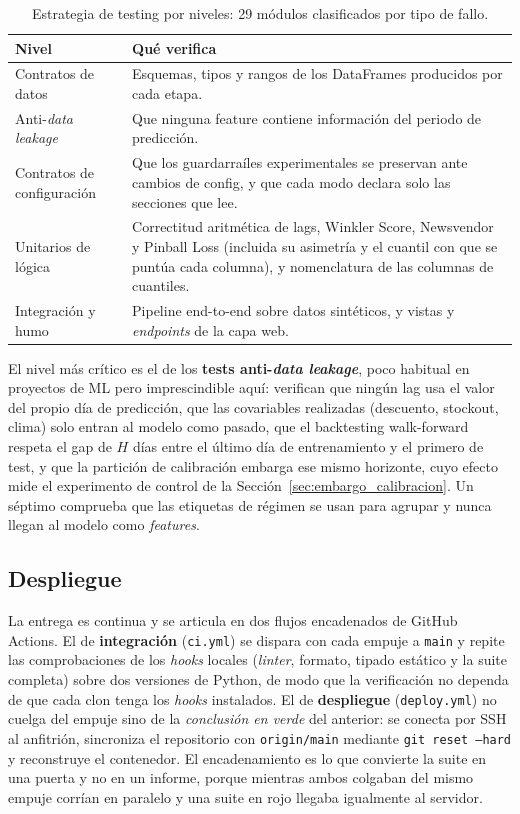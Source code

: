 \begin{table}[htbp]
    \centering
    \small
    \begin{tabular}{lp{9.5cm}}
        \toprule
        \textbf{Nivel} & \textbf{Qué verifica} \\
        \midrule
        Contratos de datos & Esquemas, tipos y rangos de los DataFrames producidos por cada etapa. \\
        Anti-\textit{data leakage} & Que ninguna feature contiene información del periodo de predicción. \\
        Contratos de configuración & Que los guardarraíles experimentales se preservan ante cambios de config, y que cada modo declara solo las secciones que lee. \\
        Unitarios de lógica & Correctitud aritmética de lags, Winkler Score, Newsvendor y Pinball Loss (incluida su asimetría y el cuantil con que se puntúa cada columna), y nomenclatura de las columnas de cuantiles. \\
        Integración y humo & Pipeline end-to-end sobre datos sintéticos, y vistas y \textit{endpoints} de la capa web. \\
        \bottomrule
    \end{tabular}
    \caption{Estrategia de testing por niveles: 29 módulos clasificados por tipo de fallo.}
    \label{tab:test_strategy}
\end{table}

El nivel más crítico es el de los \textbf{tests anti-\textit{data leakage}}, poco habitual en proyectos de ML pero imprescindible aquí: verifican que ningún lag usa el valor del propio día de predicción, que las covariables realizadas (descuento, stockout, clima) solo entran al modelo como pasado, que el backtesting walk-forward respeta el gap de $H$ días entre el último día de entrenamiento y el primero de test, y que la partición de calibración embarga ese mismo horizonte, cuyo efecto mide el experimento de control de la Sección~\ref{sec:embargo_calibracion}. Un séptimo comprueba que las etiquetas de régimen se usan para agrupar y nunca llegan al modelo como \textit{features}.

\subsection{Despliegue}

La entrega es continua y se articula en dos flujos encadenados de GitHub Actions. El de \textbf{integración} (\texttt{ci.yml}) se dispara con cada empuje a \texttt{main} y repite las comprobaciones de los \textit{hooks} locales (\textit{linter}, formato, tipado estático y la suite completa) sobre dos versiones de Python, de modo que la verificación no dependa de que cada clon tenga los \textit{hooks} instalados. El de \textbf{despliegue} (\texttt{deploy.yml}) no cuelga del empuje sino de la \emph{conclusión en verde} del anterior: se conecta por SSH al anfitrión, sincroniza el repositorio con \texttt{origin/main} mediante \texttt{git reset --hard} y reconstruye el contenedor. El encadenamiento es lo que convierte la suite en una puerta y no en un informe, porque mientras ambos colgaban del mismo empuje corrían en paralelo y una suite en rojo llegaba igualmente al servidor.

